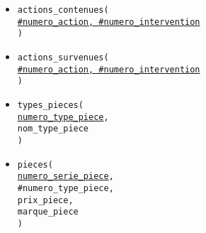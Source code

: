 \documentclass[a4paper,11pt]{article} %
\begin{document}
\begin{itemize}[leftmargin=*]
{        tarif\_action \\
    )}
    \item \texttt{actions\_contenues( \\
        \underline{\#numero\_action, \#numero\_intervention} \\
    )}
    \item \texttt{actions\_survenues( \\
        \underline{\#numero\_action, \#numero\_intervention} \\
    )}
    \item \texttt{types\_pieces( \\
        \underline{numero\_type\_piece}, \\
        nom\_type\_piece \\
    )}

    \newpage
    \item \texttt{pieces( \\
        \underline{numero\_serie\_piece}, \\
        \#numero\_type\_piece, \\
        prix\_piece, \\
        marque\_piece \\
    )}
    

\end{itemize}
\end{document}
